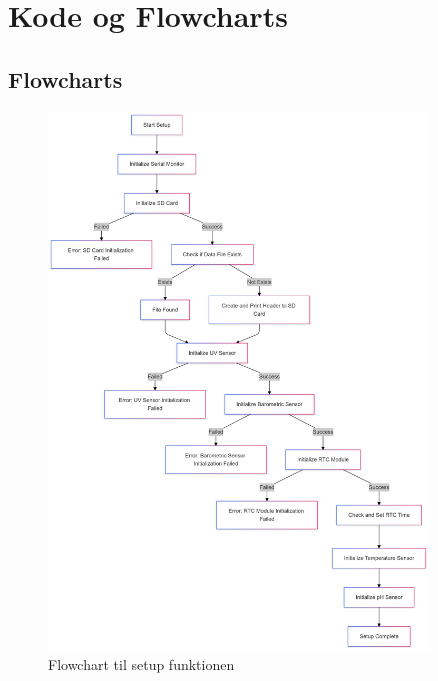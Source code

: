 \section{Kode og Flowcharts}
	\subsection{Flowcharts}
		\begin{figure}[!h]
			\centering
			\includegraphics[width=0.9\textwidth]{Figures/Flowchart setup.png}
			\caption{Flowchart til setup funktionen}
		\end{figure}
		
